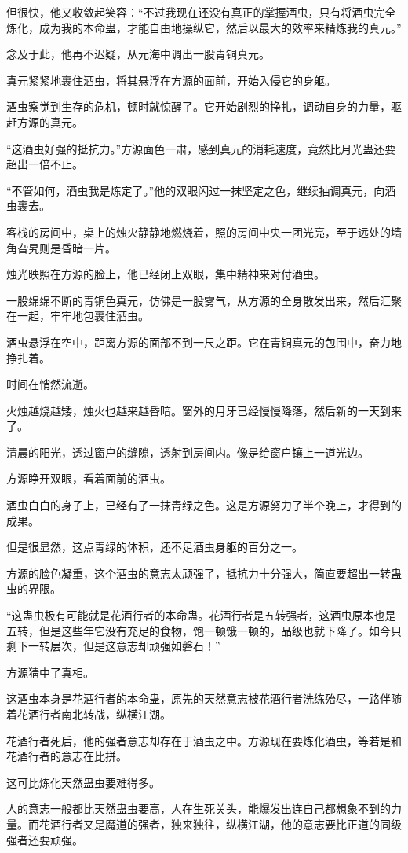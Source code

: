 \begin{this_body}
但很快，他又收敛起笑容：“不过我现在还没有真正的掌握酒虫，只有将酒虫完全炼化，成为我的本命蛊，才能自由地操纵它，然后以最大的效率来精炼我的真元。”

念及于此，他再不迟疑，从元海中调出一股青铜真元。

真元紧紧地裹住酒虫，将其悬浮在方源的面前，开始入侵它的身躯。

酒虫察觉到生存的危机，顿时就惊醒了。它开始剧烈的挣扎，调动自身的力量，驱赶方源的真元。

“这酒虫好强的抵抗力。”方源面色一肃，感到真元的消耗速度，竟然比月光蛊还要超出一倍不止。

“不管如何，酒虫我是炼定了。”他的双眼闪过一抹坚定之色，继续抽调真元，向酒虫裹去。

客栈的房间中，桌上的烛火静静地燃烧着，照的房间中央一团光亮，至于远处的墙角旮旯则是昏暗一片。

烛光映照在方源的脸上，他已经闭上双眼，集中精神来对付酒虫。

一股绵绵不断的青铜色真元，仿佛是一股雾气，从方源的全身散发出来，然后汇聚在一起，牢牢地包裹住酒虫。

酒虫悬浮在空中，距离方源的面部不到一尺之距。它在青铜真元的包围中，奋力地挣扎着。

时间在悄然流逝。

火烛越烧越矮，烛火也越来越昏暗。窗外的月牙已经慢慢降落，然后新的一天到来了。

清晨的阳光，透过窗户的缝隙，透射到房间内。像是给窗户镶上一道光边。

方源睁开双眼，看着面前的酒虫。

酒虫白白的身子上，已经有了一抹青绿之色。这是方源努力了半个晚上，才得到的成果。

但是很显然，这点青绿的体积，还不足酒虫身躯的百分之一。

方源的脸色凝重，这个酒虫的意志太顽强了，抵抗力十分强大，简直要超出一转蛊虫的界限。

“这蛊虫极有可能就是花酒行者的本命蛊。花酒行者是五转强者，这酒虫原本也是五转，但是这些年它没有充足的食物，饱一顿饿一顿的，品级也就下降了。如今只剩下一转层次，但是这意志却顽强如磐石！”

方源猜中了真相。

这酒虫本身是花酒行者的本命蛊，原先的天然意志被花酒行者洗练殆尽，一路伴随着花酒行者南北转战，纵横江湖。

花酒行者死后，他的强者意志却存在于酒虫之中。方源现在要炼化酒虫，等若是和花酒行者的意志在比拼。

这可比炼化天然蛊虫要难得多。

人的意志一般都比天然蛊虫要高，人在生死关头，能爆发出连自己都想象不到的力量。而花酒行者又是魔道的强者，独来独往，纵横江湖，他的意志要比正道的同级强者还要顽强。


\end{this_body}
